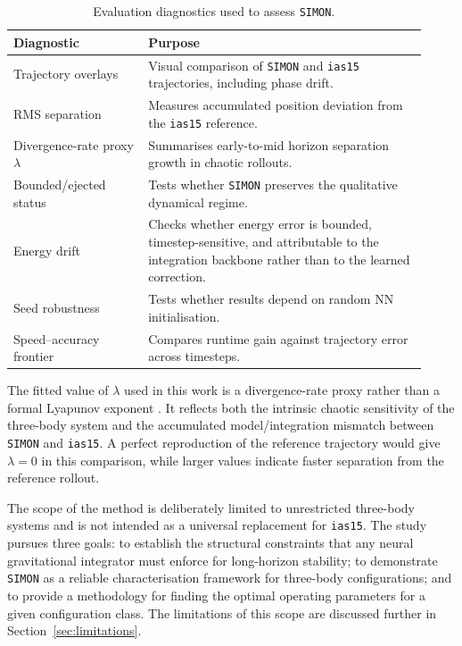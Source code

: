 \documentclass[12pt]{article}
\begin{document}
\begin{table}[H]
\centering
\caption{Evaluation diagnostics used to assess \texttt{SIMON}.}
\label{tab:evaluation_strategy}
\begin{tabular}{@{}p{0.30\linewidth}p{0.62\linewidth}@{}}
\toprule
\textbf{Diagnostic} & \textbf{Purpose} \\
\midrule
Trajectory overlays & Visual comparison of \texttt{SIMON} and \texttt{ias15} trajectories, including phase drift. \\
RMS separation & Measures accumulated position deviation from the \texttt{ias15} reference. \\
Divergence-rate proxy $\lambda$ & Summarises early-to-mid horizon separation growth in chaotic rollouts. \\
Bounded/ejected status & Tests whether \texttt{SIMON} preserves the qualitative dynamical regime. \\
Energy drift & Checks whether energy error is bounded, timestep-sensitive, and
attributable to the integration backbone rather than to the learned correction. \\
Seed robustness & Tests whether results depend on random NN initialisation. \\
Speed--accuracy frontier & Compares runtime gain against trajectory error across timesteps. \\
\bottomrule
\end{tabular}
\end{table}

The fitted value of $\lambda$ used in this work is a divergence-rate proxy rather than a
formal Lyapunov exponent \citep{sep-chaos}. It reflects both the intrinsic chaotic sensitivity
of the three-body system and the accumulated model/integration mismatch between
\texttt{SIMON} and \texttt{ias15}. A perfect reproduction of the reference trajectory would give
$\lambda=0$ in this comparison, while larger values indicate faster separation from the
reference rollout.

The scope of the method is deliberately limited to unrestricted three-body systems and is
not intended as a universal replacement for \texttt{ias15}. The study pursues three goals:
to establish the structural constraints that any neural gravitational integrator must enforce
for long-horizon stability; to demonstrate \texttt{SIMON} as a reliable characterisation
framework for three-body configurations; and to provide a methodology for finding the
optimal operating parameters for a given configuration class.
The limitations of this scope are discussed further in Section~\ref{sec:limitations}.
\end{document}
